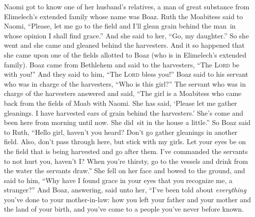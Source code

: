 
\begin{inparaenum}
   Naomi got to know one of her husband's relatives, a man of great substance from Elimelech's extended family whose name was Boaz.%
   Ruth the Moabitess said to Naomi, ``Please, let me go to the field and I'll glean grain behind the man\understood\ in whose opinion I shall find grace.'' And she said to her, ``Go, my daughter.''%
   So she went and she came and gleaned behind the harvesters. And it so happened that she came upon one of the fields allotted to Boaz (who is in Elimelech's extended family).%
   Boaz came from Bethlehem and said to the harvesters, ``The \textsc{Lord} be with you!'' And they said to him, ``The \textsc{Lord} bless you!''%
   Boaz said to his servant who was in charge of the harvesters, ``Who is this girl?''%
   The servant who was in charge of the harvesters answered and said, ``The girl is a Moabitess who came back from the fields of Moab with Naomi.%
   She has said, `Please let me gather gleanings. I have harvested ears of grain behind the harvesters.' She's come and been here from morning until now. She did\understood\ sit in the house a little.''%
   So Boaz said to Ruth, ``Hello girl, haven't you heard? Don't go gather gleanings in another field. Also, don't pass through here, but stick with my girls.%
   Let your eyes be on the field that is being harvested and go after them. I've commanded the servants to not hurt you, haven't I? When you're thirsty, go to the vessels and drink from the water\understood{} the servants draw.''%
   She fell on her face and bowed to the ground, and said to him, ``Why have I found grace in your eyes that you recognize me, a stranger?''%
   And Boaz, answering, said unto her, ``I've been told about \emph{everything} you've done to your mother-in-law: how you left your father and your mother and the land of your birth, and you've come to a people you've never before known.%

\end{inparaenum}
